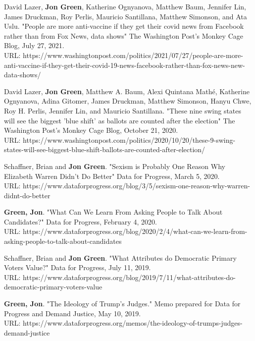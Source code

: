 \documentclass[letterpaper]{article}
\renewenvironment{itemize}{
  \begin{list}{}{
    \setlength{\leftmargin}{1.5em}
  }
}{
  \end{list}
}
\begin{document}
\begin{itemize}

\item David Lazer, \textbf{Jon Green}, Katherine Ognyanova, Matthew Baum, Jennifer Lin, James Druckman, Roy Perlis, Mauricio Santillana, Matthew Simonson, and Ata Uslu. "People are more anti-vaccine if they get their covid news from Facebook rather than from Fox News, data shows" The Washington Post's Monkey Cage Blog, July 27, 2021. \\ 
URL: https://www.washingtonpost.com/politics/2021/07/27/people-are-more-anti-vaccine-if-they-get-their-covid-19-news-facebook-rather-than-fox-news-new-data-shows/

\item David Lazer, \textbf{Jon Green}, Matthew A. Baum, Alexi Quintana Mathé, Katherine Ognyanova, Adina Gitomer, James Druckman, Matthew Simonson, Hanyu Chwe, Roy H. Perlis, Jennifer Lin, and Mauricio Santillana. "These nine swing states will see the biggest 'blue shift' as ballots are counted after the election" The Washington Post's Monkey Cage Blog, October 21, 2020. \\ 
URL: https://www.washingtonpost.com/politics/2020/10/20/these-9-swing-states-will-see-biggest-blue-shift-ballots-are-counted-after-election/

\item Schaffner, Brian and \textbf{Jon Green}. "Sexism is Probably One Reason Why Elizabeth Warren Didn't Do Better" Data for Progress, March 5, 2020. \\
URL: https://www.dataforprogress.org/blog/3/5/sexism-one-reason-why-warren-didnt-do-better

\item \textbf{Green, Jon}. "What Can We Learn From Asking People to Talk About Candidates?" Data for Progress, February 4, 2020. \\
URL: https://www.dataforprogress.org/blog/2020/2/4/what-can-we-learn-from-asking-people-to-talk-about-candidates

\item Schaffner, Brian and \textbf{Jon Green}. "What Attributes do Democratic Primary Voters Value?" Data for Progress, July 11, 2019. \\
URL: https://www.dataforprogress.org/blog/2019/7/11/what-attributes-do-democratic-primary-voters-value

\item \textbf{Green, Jon}. "The Ideology of Trump's Judges." Memo prepared for Data for Progress and Demand Justice, May 10, 2019. \\
URL: https://www.dataforprogress.org/memos/the-ideology-of-trumps-judges-demand-justice


\end{itemize}
\end{document}

